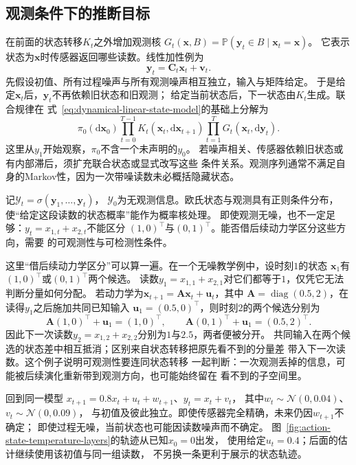 \subsection{观测条件下的推断目标}
在前面的状态转移$K_t$之外增加观测核
$G_t(\bm x,B)=\mathbb P(\bm y_t\in B\mid\bm x_t=\bm x)$。
它表示状态为$\bm x$时传感器返回哪些读数。线性加性例为
\begin{equation}
  \bm y_t=\bm C_t\bm x_t+\bm v_t.
  \label{eq:dynamical-linear-observation-model}
\end{equation}
先假设初值、所有过程噪声与所有观测噪声相互独立，输入与矩阵给定。
于是给定$\bm x_t$后，$\bm y_t$不再依赖旧状态和旧观测；
给定当前状态后，下一状态由$K_t$生成。联合规律在
式~\eqref{eq:dynamical-linear-state-model}的基础上分解为
\[
 \pi_0(\mathrm d\bm x_0)
       \prod_{t=0}^{T-1}K_t(\bm x_t,\mathrm d\bm x_{t+1})
       \prod_{t=1}^T G_t(\bm x_t,\mathrm d\bm y_t).
\]
这里从$y_1$开始观察，$\pi_0$不含一个未声明的$y_0$。
若噪声相关、传感器依赖旧状态或有内部滞后，须扩充联合状态或显式改写这些
条件关系。观测序列通常不满足自身的Markov性，因为一次带噪读数未必概括隐藏状态。

记$\mathcal Y_t=\sigma(\bm y_1,\ldots,\bm y_t)$，
$\mathcal Y_0$为无观测信息。欧氏状态与观测具有正则条件分布，
使“给定这段读数的状态概率”能作为概率核处理。
即使观测无噪，也不一定足够：$y_t=x_{1,t}+x_{2,t}$不能区分
$(1,0)^\top$与$(0,1)^\top$。能否借后续动力学区分这些方向，需要
的可观测性与可检测性条件。

这里“借后续动力学区分”可以算一遍。在一个无噪教学例中，设时刻$1$的状态
$\bm x_1$有$(1,0)^\top$或$(0,1)^\top$两个候选。
读数$y_1=x_{1,1}+x_{2,1}$对它们都等于$1$，仅凭它无法判断分量如何分配。
若动力学为$\bm x_{t+1}=\bm A\bm x_t+\bm u_t$，其中
$\bm A=\operatorname{diag}(0.5,2)$，在读得$y_1$之后施加共同已知输入
$\bm u_1=(0.5,0)^\top$，则时刻$2$的两个候选分别为
\[
 \bm A(1,0)^\top+\bm u_1=(1,0)^\top,\qquad
 \bm A(0,1)^\top+\bm u_1=(0.5,2)^\top.
\]
因此下一次读数$y_2=x_{1,2}+x_{2,2}$分别为$1$与$2.5$，两者便被分开。
共同输入在两个候选的状态差中相互抵消；区别来自状态转移把原先看不到的分量差
带入下一次读数。这个例子说明可观测性要连同状态转移
一起判断：一次观测丢掉的信息，可能被后续演化重新带到观测方向，也可能始终留在
看不到的子空间里。

\begin{example}[带泄漏温度的间接观测]
 \label{ex:dynamical-noisy-temperature}
 回到同一模型
 $x_{t+1}=0.8x_t+u_t+w_{t+1}$、$y_t=x_t+v_t$，
 其中$w_t\sim\mathcal N(0,0.04)$、$v_t\sim\mathcal N(0,0.09)$，
 与初值及彼此独立。即使传感器完全精确，未来仍因$w_{t+1}$不确定；
 即使过程无噪，当前状态也可能因读数噪声而不确定。
 图~\ref{fig:action-state-temperature-layers}的轨迹从已知$x_0=0$出发，
 使用给定$u_t=0.4$；后面的估计继续使用该初值与同一组读数，
 不另换一条更利于展示的状态轨迹。
\end{example}

